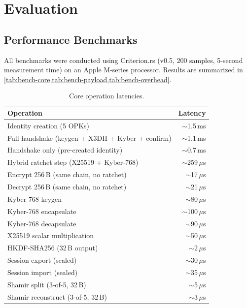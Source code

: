 \documentclass[11pt,a4paper]{article}
\theoremstyle{definition}
\begin{document}
\section{Evaluation}\label{sec:evaluation}

\subsection{Performance Benchmarks}\label{sec:benchmarks}

All benchmarks were conducted using Criterion.rs (v0.5, 200 samples, 5-second measurement time) on an Apple M-series processor. Results are summarized in \cref{tab:bench-core,tab:bench-payload,tab:bench-overhead}.

\begin{table}[H]
\centering
\caption{Core operation latencies.}\label{tab:bench-core}
\small
\begin{tabular}{@{}lr@{}}
\toprule
Operation & Latency \\
\midrule
Identity creation (5 OPKs) & $\sim$1.5\,ms \\
Full handshake (keygen + X3DH + Kyber + confirm) & $\sim$1.1\,ms \\
Handshake only (pre-created identity) & $\sim$0.7\,ms \\
Hybrid ratchet step (X25519 + Kyber-768) & $\sim$259\,$\mu$s \\
Encrypt 256\,B (same chain, no ratchet) & $\sim$17\,$\mu$s \\
Decrypt 256\,B (same chain, no ratchet) & $\sim$21\,$\mu$s \\
\midrule
Kyber-768 keygen & $\sim$80\,$\mu$s \\
Kyber-768 encapsulate & $\sim$100\,$\mu$s \\
Kyber-768 decapsulate & $\sim$90\,$\mu$s \\
X25519 scalar multiplication & $\sim$50\,$\mu$s \\
HKDF-SHA256 (32\,B output) & $\sim$2\,$\mu$s \\
\midrule
Session export (sealed) & $\sim$30\,$\mu$s \\
Session import (sealed) & $\sim$35\,$\mu$s \\
Shamir split (3-of-5, 32\,B) & $\sim$5\,$\mu$s \\
Shamir reconstruct (3-of-5, 32\,B) & $\sim$3\,$\mu$s \\
\bottomrule
\end{tabular}
\end{table}
\end{document}
